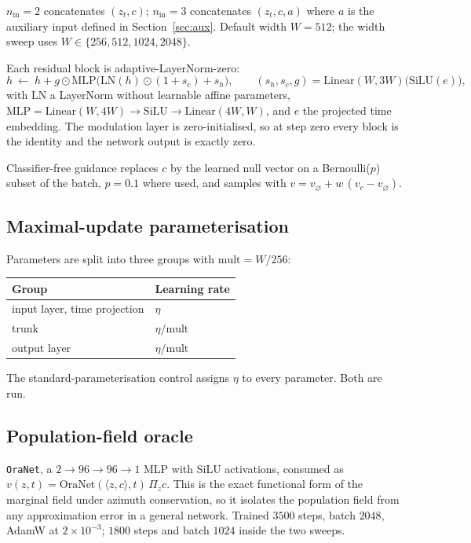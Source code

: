 \documentclass[11pt]{article}
\begin{document}
$n_{\mathrm{in}}=2$ concatenates $(z_t,c)$; $n_{\mathrm{in}}=3$ concatenates $(z_t,c,a)$ where $a$
is the auxiliary input defined in Section~\ref{sec:aux}. Default width $W=512$; the width sweep
uses $W\in\{256,512,1024,2048\}$.

Each residual block is adaptive-LayerNorm-zero:
\[
h\ \leftarrow\ h+g\odot\mathrm{MLP}\big(\mathrm{LN}(h)\odot(1+s_c)+s_h\big),\qquad
(s_h,s_c,g)=\mathrm{Linear}(W,3W)\big(\mathrm{SiLU}(e)\big),
\]
with $\mathrm{LN}$ a LayerNorm without learnable affine parameters, $\mathrm{MLP}=
\mathrm{Linear}(W,4W)\to\mathrm{SiLU}\to\mathrm{Linear}(4W,W)$, and $e$ the projected time
embedding. The modulation layer is zero-initialised, so at step zero every block is the identity
and the network output is exactly zero.

Classifier-free guidance replaces $c$ by the learned null vector on a Bernoulli($p$) subset of the
batch, $p=0.1$ where used, and samples with
$v=v_\varnothing+w\,(v_c-v_\varnothing)$.

\subsection*{Maximal-update parameterisation}

Parameters are split into three groups with $\mathrm{mult}=W/256$:

\begin{center}
\begin{tabular}{@{}ll@{}}
\toprule
Group & Learning rate\\
\midrule
input layer, time projection & $\eta$\\
trunk & $\eta/\mathrm{mult}$\\
output layer & $\eta/\mathrm{mult}$\\
\bottomrule
\end{tabular}
\end{center}

The standard-parameterisation control assigns $\eta$ to every parameter. Both are run.

\subsection*{Population-field oracle}

\texttt{OraNet}, a $2\to96\to96\to1$ MLP with SiLU activations, consumed as
$v(z,t)=\mathrm{OraNet}(\langle z,c\rangle,t)\,\Pi_z c$. This is the exact functional form of the
marginal field under azimuth conservation, so it isolates the population field from any
approximation error in a general network. Trained $3500$ steps, batch $2048$, AdamW at
$2\times10^{-3}$; $1800$ steps and batch $1024$ inside the two sweeps.
\end{document}
